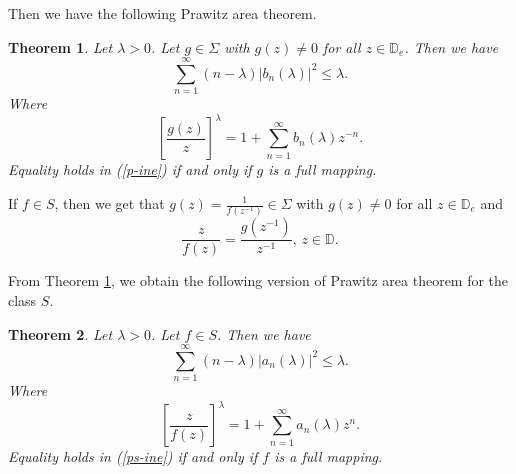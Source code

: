 \documentclass[10pt]{amsart}
\newtheorem{theorem}{Theorem}[section]
\theoremstyle{definition}
\theoremstyle{remark}
\numberwithin{equation}{section}
\begin{document}
Then we have the following Prawitz area theorem.
\begin{theorem}\label{pra}
Let $\lambda>0$. Let $g\in \Sigma$ with $g(z)\neq0$ for all $z\in \mathbb{D}_e$.  Then we have 
\begin{equation}\label{p-ine}
\sum_{n=1}^{\infty}(n-\lambda)|b_n(\lambda)|^2 \leq \lambda.
\end{equation}
Where \begin{equation}
\left[\frac{g(z)}{z}\right]^{\lambda}=1+\sum_{n=1}^{\infty}b_n(\lambda) z^{-n}.\nonumber 
\end{equation}
Equality holds in (\ref{p-ine}) if and only if $g$ is a full mapping.
\end{theorem}

If $f\in S$,  then we get that $g(z)=\frac{1}{f(z^{-1})}\in \Sigma$ with $g(z)\neq 0$ for all $z\in \mathbb{D}_e$ and 
$$\frac{z}{f(z)}=\frac{g(z^{-1})}{z^{-1}},\, z\in \mathbb{D}.$$ 

From Theorem \ref{pra},  we obtain the following version of Prawitz area theorem for the class $S$.
\begin{theorem}\label{pra-s}
Let $\lambda>0$. Let $f\in S$.  Then we have 
\begin{equation}\label{ps-ine}
\sum_{n=1}^{\infty}(n-\lambda)|a_n(\lambda)|^2 \leq \lambda.
\end{equation}
Where \begin{equation}
\left[\frac{z}{f(z)}\right]^{\lambda}=1+\sum_{n=1}^{\infty}a_n(\lambda) z^{n}.\nonumber 
\end{equation}
Equality holds in (\ref{ps-ine}) if and only if $f$ is a full mapping.
\end{theorem}
\end{document}
